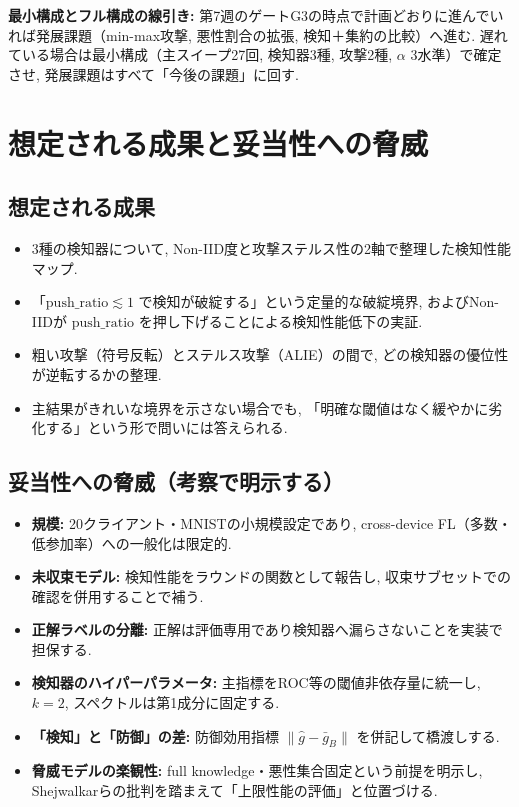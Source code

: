 \documentclass[a4j, twocolumn, dvipdfmx]{jsarticle}
\begin{document}
\noindent
\textbf{最小構成とフル構成の線引き:} 第7週のゲートG3の時点で計画どおりに進んでいれば発展課題（min-max攻撃, 悪性割合の拡張, 検知＋集約の比較）へ進む. 遅れている場合は最小構成（主スイープ27回, 検知器3種, 攻撃2種, $\alpha$ 3水準）で確定させ, 発展課題はすべて「今後の課題」に回す.

\section{想定される成果と妥当性への脅威}

\subsection{想定される成果}

\begin{itemize}
  \item 3種の検知器について, Non-IID度と攻撃ステルス性の2軸で整理した検知性能マップ.
  \item 「$\mathrm{push\_ratio} \lesssim 1$ で検知が破綻する」という定量的な破綻境界, およびNon-IIDが $\mathrm{push\_ratio}$ を押し下げることによる検知性能低下の実証.
  \item 粗い攻撃（符号反転）とステルス攻撃（ALIE）の間で, どの検知器の優位性が逆転するかの整理.
  \item 主結果がきれいな境界を示さない場合でも, 「明確な閾値はなく緩やかに劣化する」という形で問いには答えられる.
\end{itemize}

\subsection{妥当性への脅威（考察で明示する）}

\begin{itemize}
  \item \textbf{規模:} 20クライアント・MNISTの小規模設定であり, cross-device FL（多数・低参加率）への一般化は限定的.
  \item \textbf{未収束モデル:} 検知性能をラウンドの関数として報告し, 収束サブセットでの確認を併用することで補う.
  \item \textbf{正解ラベルの分離:} 正解は評価専用であり検知器へ漏らさないことを実装で担保する.
  \item \textbf{検知器のハイパーパラメータ:} 主指標をROC等の閾値非依存量に統一し, $k=2$, スペクトルは第1成分に固定する.
  \item \textbf{「検知」と「防御」の差:} 防御効用指標 $\|\hat{g} - \bar{g}_B\|$ を併記して橋渡しする.
  \item \textbf{脅威モデルの楽観性:} full knowledge・悪性集合固定という前提を明示し, Shejwalkarら\cite{shejwalkar2022back}の批判を踏まえて「上限性能の評価」と位置づける.
\end{itemize}
\end{document}
